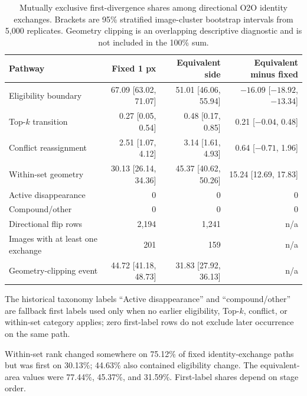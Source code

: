 \documentclass[preprint,10pt]{elsarticle}
\begin{document}
\begin{table}[ht]
\centering
\caption{Mutually exclusive first-divergence shares among directional O2O identity exchanges. Brackets are 95\% stratified image-cluster bootstrap intervals from 5,000 replicates. Geometry clipping is an overlapping descriptive diagnostic and is not included in the 100\% sum.}
\begin{tabular}{@{}lrrr@{}}
\toprule
Pathway & Fixed 1 px & Equivalent side & Equivalent minus fixed \\
\midrule
Eligibility boundary & 67.09 [63.02, 71.07] & 51.01 [46.06, 55.94] & $-16.09$ [$-18.92$, $-13.34$] \\
Top-$k$ transition & 0.27 [0.05, 0.54] & 0.48 [0.17, 0.85] & 0.21 [$-0.04$, 0.48] \\
Conflict reassignment & 2.51 [1.07, 4.12] & 3.14 [1.61, 4.93] & 0.64 [$-0.71$, 1.96] \\
Within-set geometry & 30.13 [26.14, 34.36] & 45.37 [40.62, 50.26] & 15.24 [12.69, 17.83] \\
Active disappearance & 0 & 0 & 0 \\
Compound/other & 0 & 0 & 0 \\
\midrule
Directional flip rows & 2,194 & 1,241 & n/a \\
Images with at least one exchange & 201 & 159 & n/a \\
Geometry-clipping event & 44.72 [41.18, 48.73] & 31.83 [27.92, 36.13] & n/a \\
\bottomrule
\end{tabular}
\end{table}

The historical taxonomy labels ``Active disappearance'' and ``compound/other'' are fallback first labels used only when no earlier eligibility, Top-$k$, conflict, or within-set category applies; zero first-label rows do not exclude later occurrence on the same path.

\begin{table}[ht]
\centering
\caption{First-label shares versus multi-label stage occurrence among directional O2O identity exchanges (\%). ``Any'' columns do not enforce exclusivity. Brackets are 95\% stratified image-cluster bootstrap intervals from 5,000 replicates.}
\resizebox{\textwidth}{!}{}
\end{table}

Within-set rank changed somewhere on 75.12\% of fixed identity-exchange paths but was first on 30.13\%; 44.63\% also contained eligibility change. The equivalent-area values were 77.44\%, 45.37\%, and 31.59\%. First-label shares depend on stage order.
\end{document}
